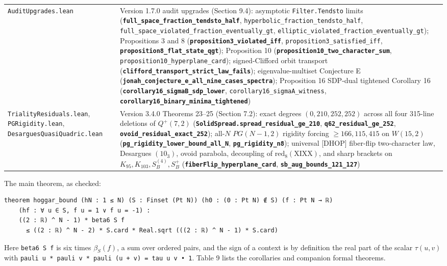 \documentclass[11pt,a4paper]{article}
\begin{document}
{{\begin{longtable}[]{@{}>{\raggedright\arraybackslash}p{}>{\raggedright\arraybackslash}p{}@{}}
\nolinkurl{AuditUpgrades.lean} & Version 1.7.0 audit upgrades (Section 9.4): asymptotic \texttt{Filter.Tendsto} limits (\textbf{\nolinkurl{full_space_fraction_tendsto_half}}, \nolinkurl{hyperbolic_fraction_tendsto_half}, \nolinkurl{full_space_violated_fraction_eventually_gt}, \nolinkurl{elliptic_violated_fraction_eventually_gt}); Propositions 3 and 8 (\textbf{\nolinkurl{proposition3_violated_iff}}, \nolinkurl{proposition3_satisfied_iff}, \textbf{\nolinkurl{proposition8_flat_state_qgt}}); Proposition 10 (\textbf{\nolinkurl{proposition10_two_character_sum}}, \nolinkurl{proposition10_hyperplane_card}); signed-Clifford orbit transport (\textbf{\nolinkurl{clifford_transport_strict_law_fails}}); eigenvalue-multiset Conjecture E (\textbf{\nolinkurl{jonah_conjecture_e_all_nine_cases_spectra}}); Proposition 16\textquotesingle{} SDP-dual tightened Corollary 16 (\textbf{\nolinkurl{corollary16_sigmaB_sdp_lower}}, \nolinkurl{corollary16_sigmaA_witness}, \textbf{\nolinkurl{corollary16_binary_minima_tightened}}) \\
\nolinkurl{TrialityResiduals.lean}, \nolinkurl{PGRigidity.lean}, \nolinkurl{DesarguesQuasiQuadric.lean} & Version 3.4.0 Theorems 23--25 (Section 7.2): exact degrees \((0, 210, 252, 252)\) across all four 315-line deletions of \(Q^+(7,2)\) (\textbf{\nolinkurl{SolidSpread.spread_residual_ge_210}}, \textbf{\nolinkurl{q62_residual_ge_252}}, \textbf{\nolinkurl{ovoid_residual_exact_252}}); all-\(N\) \(PG(N-1,2)\) rigidity forcing \(\ge 166{,}115{,}415\) on \(W(15,2)\) (\textbf{\nolinkurl{pg_rigidity_lower_bound_all_N}}, \textbf{\nolinkurl{pg_rigidity_n8}}); universal {[}DHOP{]} fiber-flip two-character law, Desargues \((10_3)\), ovoid parabola, decoupling of \(\mathrm{red}_8(\mathrm{XIXX})\), and sharp brackets on \(K_{95}, K_{103}, S_B^{(4)}, S_B^+\) (\textbf{\nolinkurl{fiberFlip_hyperplane_card}}, \textbf{\nolinkurl{sb_aug_bounds_121_127}}) \\
\end{longtable}
}
}

The main theorem, as checked:

\begin{verbatim}
theorem hoggar_bound (hN : 1 ≤ N) (S : Finset (Pt N)) (h0 : (0 : Pt N) ∉ S) (f : Pt N → ℝ)
    (hf : ∀ u ∈ S, f u = 1 ∨ f u = -1) :
    ((2 : ℝ) ^ N - 1) * beta6 S f
      ≤ ((2 : ℝ) ^ N - 2) * S.card * Real.sqrt (((2 : ℝ) ^ N - 1) * S.card)
\end{verbatim}

Here \texttt{beta6\ S\ f} is six times \(\beta_S(f)\), a sum over ordered pairs, and the sign of a context is by
definition the real part of the scalar \(\tau(u,v)\) with \texttt{pauli\ u\ *\ pauli\ v\ *\ pauli\ (u\ +\ v)\ =\ tau\ u\ v\ •\ 1}.
Table 9 lists the corollaries and companion formal theorems.
\end{document}
